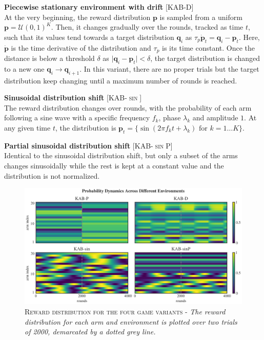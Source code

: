 \hfill \break
\noindent \textbf{Piecewise stationary environment with drift} [\textsc{KAB-D}]\\ At the very beginning, the reward distribution $\mathbf{p}$ is sampled from a uniform $\mathbf{p}=\mathcal{U}(0, 1)^{K}$. Then, it changes gradually over the rounds, tracked as time $t$, such that its values tend towards a target distribution $\mathbf{q}_{i}$ as $\tau_{p}\dot{\mathbf{p}}_{t}=\mathbf{q}_{i}-\mathbf{p}_{t}$.
Here, $\dot{\mathbf{p}}$ is the time derivative of the distribution and $\tau_{p}$ is its time constant.
Once the distance is below a threshold $\delta$ as $\vert \mathbf{q}_{i} - \mathbf{p}_{t}\vert < \delta$, the target distribution is changed to a new one $\mathbf{q}_{i}\to\mathbf{q}_{i+1}$. In this variant, there are no proper trials but the target distribution keep changing until a maximum number
of rounds is reached.

\hfill \break
\noindent \textbf{Sinusoidal distribution shift} [\textsc{KAB-$\sin$}]\\ The reward distribution changes over rounds, with the probability of each arm following a sine wave with a specific frequency $f_{k}$, phase $\lambda_{k}$ and amplitude $1$. At any given time $t$, the distribution is $\mathbf{p}_{t}=\{\sin(2\pi f_{k} t+\lambda_{k})\text{  for }k=1\ldots K\}$.

\hfill \break
\noindent \textbf{Partial sinusoidal distribution shift} [\textsc{KAB-$\sin$P}]\\ Identical to the sinusoidal distribution shift, but only a subset of the arms changes sinusoidally while the rest is kept at a constant value and the distribution is not normalized.


\begin{figure}[ht]
    \centering
    \includegraphics[width=1.\textwidth]{figures/envs_1.png}
    \caption{\textsc{Reward distribution for the four game variants} - \textit{The reward distribution for each arm and environment is plotted over two trials of 2000, demarcated by a dotted grey line.}}
    \label{fig:envs}
\end{figure}


